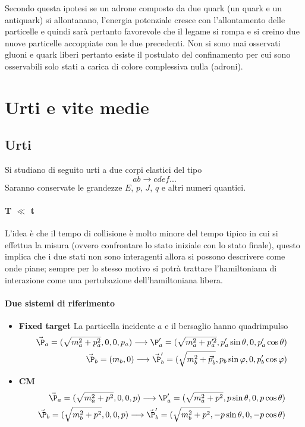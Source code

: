 \documentclass[12pt]{book}
\begin{document}
Secondo questa ipotesi se un adrone composto da due quark (un quark e un antiquark) si allontanano, l'energia potenziale cresce con l'allontamento delle particelle  e quindi sarà pertanto favorevole che il legame si rompa e si creino due nuove particelle accoppiate con le due precedenti. Non si sono mai osservati gluoni e quark liberi pertanto esiste il postulato del confinamento per cui sono osservabili solo stati a carica di colore complessiva nulla (adroni).
 

\chapter{Urti e vite medie}
\section{Urti}

Si studiano di seguito urti a due corpi elastici del tipo
\begin{equation}
	a b \rightarrow c def...
\end{equation}
Saranno conservate le grandezze $E$, $p$, $J$, $q$ e altri numeri quantici. 
\subsubsection{T $\ll$ t}
L'idea è che il tempo di collisione è molto minore del tempo tipico in cui si effettua la misura (ovvero confrontare lo stato iniziale con lo stato finale), questo implica che i due stati non sono interagenti allora si possono descrivere come onde piane; sempre per lo stesso motivo si potrà trattare l'hamiltoniana di interazione come una pertubazione dell'hamiltoniana libera.

\subsubsection{Due sistemi di riferimento}
\begin{itemize}
	\item \textbf{Fixed target} La particella incidente $a$ e il bersaglio hanno quadrimpulso
	\begin{align}
		\vec \P_a = (\sqrt{m^2_a +p_a^2}, 0 , 0 , p_a) \longrightarrow \P'_a = ( \sqrt{m_a^2 +  p_a'^2}, p_a'\sin \theta , 0 , p_a' \cos \theta )\\
		\vec \P_b = (m_b,0) \longrightarrow \vec \P'_b =( \sqrt{m_b^2 +\vec p'_b} , p_b \sin \varphi , 0 , p'_b \cos \varphi )
	\end{align}
	
	\item \textbf{CM}
		\begin{align}
		\vec \P_a = (\sqrt{m^2_a +p^2}, 0 , 0 , p) \longrightarrow \P'_a = ( \sqrt{m_a^2 +  p^2}, p\sin \theta , 0 , p \cos \theta )\\
		\vec \P_b = (\sqrt{m^2_b +p^2}, 0 , 0 , p) \longrightarrow \vec \P'_b = ( \sqrt{m_b^2 +  p^2}, -p\sin \theta , 0 , -p \cos \theta )	\end{align}
\end{itemize}
\end{document}
